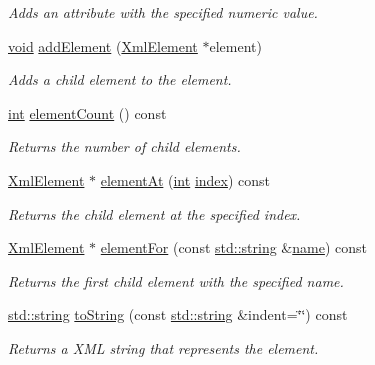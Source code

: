 \begin{DoxyCompactItemize}
\begin{DoxyCompactList}\small\item\em Adds an attribute with the specified numeric value. \end{DoxyCompactList}\item 
\hyperlink{wglew_8h_aeea6e3dfae3acf232096f57d2d57f084}{void} \hyperlink{class_xml_element_a444321a1de2a7f52994c53f9e6e0d942}{add\-Element} (\hyperlink{class_xml_element}{Xml\-Element} $\ast$element)
\begin{DoxyCompactList}\small\item\em Adds a child element to the element. \end{DoxyCompactList}\item 
\hyperlink{wglew_8h_a500a82aecba06f4550f6849b8099ca21}{int} \hyperlink{class_xml_element_a2aad0dda599cb46f85ff6b4b897045b9}{element\-Count} () const 
\begin{DoxyCompactList}\small\item\em Returns the number of child elements. \end{DoxyCompactList}\item 
\hyperlink{class_xml_element}{Xml\-Element} $\ast$ \hyperlink{class_xml_element_ac9ba93d91eaeff1467b1901f0f1cce07}{element\-At} (\hyperlink{wglew_8h_a500a82aecba06f4550f6849b8099ca21}{int} \hyperlink{fmod__codec_8h_a57f14e05b1900f16a2da82ade47d0c6d}{index}) const 
\begin{DoxyCompactList}\small\item\em Returns the child element at the specified index. \end{DoxyCompactList}\item 
\hyperlink{class_xml_element}{Xml\-Element} $\ast$ \hyperlink{class_xml_element_aca7f7e9cc621ee96805e8c69710006e8}{element\-For} (const \hyperlink{glew_8h_ae84541b4f3d8e1ea24ec0f466a8c568b}{std\-::string} \&\hyperlink{fmod__codec_8h_a5c4947d4516dd7cfa3505ce3a648a4ef}{name}) const 
\begin{DoxyCompactList}\small\item\em Returns the first child element with the specified name. \end{DoxyCompactList}\item 
\hyperlink{glew_8h_ae84541b4f3d8e1ea24ec0f466a8c568b}{std\-::string} \hyperlink{class_xml_element_a2e783a5fed6b5b31b2d11117e6c83d40}{to\-String} (const \hyperlink{glew_8h_ae84541b4f3d8e1ea24ec0f466a8c568b}{std\-::string} \&indent=\char`\"{}\char`\"{}) const 
\begin{DoxyCompactList}\small\item\em Returns a X\-M\-L string that represents the element. \end{DoxyCompactList}\end{DoxyCompactItemize}


